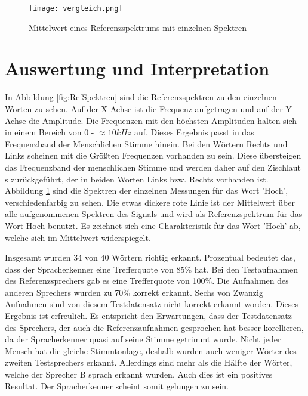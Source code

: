 \begin{figure}[H]
\centering
\texttt{[image: vergleich.png]}
\caption{Mittelwert eines Referenzspektrums mit einzelnen Spektren}
\label{fig:MittelwertSpek}
\end{figure}


\section{Auswertung und Interpretation}
\label{chap:AUSWERTUNGUNDINTERPRETATION}
In Abbildung \ref{fig:RefSpektren} sind die Referenzspektren zu den einzelnen Worten zu sehen. Auf der X-Achse ist die Frequenz aufgetragen und auf der Y-Achse die Amplitude.
Die Frequenzen mit den höchsten Amplituden halten sich in einem Bereich von 0 - $\approx 10 kHz$ auf. Dieses Ergebnis passt in das Frequenzband der Menschlichen Stimme hinein. \cite{WikiMensch} Bei den Wörtern Rechts und Links scheinen mit die Größten Frequenzen vorhanden zu sein. Diese übersteigen das Frequenzband der menschlichen Stimme und werden daher auf den Zischlaut s zurückgeführt, der in beiden Worten Links bzw. Rechts vorhanden ist. 
Abbildung \ref{fig:MittelwertSpek} sind die Spektren der einzelnen Messungen für das Wort 'Hoch', verschiedenfarbig zu sehen. Die etwas dickere rote Linie ist der Mittelwert über alle aufgenommenen Spektren des Signals und wird als Referenzspektrum für das Wort Hoch benutzt. Es zeichnet sich eine Charakteristik für das Wort 'Hoch' ab, welche sich im Mittelwert widerspiegelt.

Insgesamt wurden 34 von 40 Wörtern richtig erkannt. Prozentual bedeutet das, dass der Spracherkenner eine Trefferquote von 85\% hat. Bei den Testaufnahmen des Referenzsprechers gab es eine Trefferquote von 100\%. Die Aufnahmen des anderen Sprechers wurden zu 70\% korrekt erkannt. Sechs von Zwanzig Aufnahmen sind von diesem Testdatensatz nicht korrekt erkannt worden. Dieses Ergebnis ist erfreulich. Es entspricht den Erwartungen, dass der Testdatensatz des Sprechers, der auch die Referenzaufnahmen gesprochen hat besser korellieren, da der Spracherkenner quasi auf seine Stimme getrimmt wurde. Nicht jeder Mensch hat die gleiche Stimmtonlage, deshalb wurden auch weniger Wörter des zweiten Testsprechers erkannt. Allerdings sind mehr als die Hälfte der Wörter, welche der Sprecher B sprach erkannt wurden. Auch dies ist ein positives Resultat. Der Spracherkenner scheint somit gelungen zu sein.


